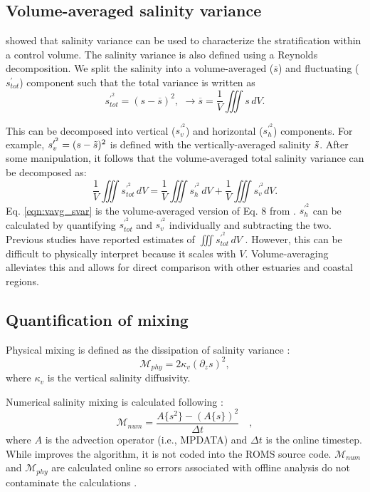 \subsection{Volume-averaged salinity variance}
\citet{Li_2018} showed that salinity variance can be used to characterize the stratification within a control volume. The salinity variance is also defined using a Reynolds decomposition. We split the salinity into a volume-averaged ($\overline{s}$) and fluctuating ($s_{tot}^\prime$) component such that the total variance is written as  
\begin{equation}
        s_{tot}^{\prime^2} = (s-\overline{s})^2, \, \, \xrightarrow{} \overline{s} = \frac{1}{V} \iiint s \, dV.  
\end{equation}

This can be decomposed into vertical ($s_v^{\prime^2}$) and horizontal ($s_h^{\prime^2}$) components. For example, $s_v^{\prime^2} = (s-\Tilde{s})^2$ is defined with the vertically-averaged salinity $\Tilde{s}$. After some manipulation, it follows that the volume-averaged total salinity variance can be decomposed as:
\begin{equation} \label{eqn:vavg_svar}
        \frac{1}{V} \iiint s_{tot}^{\prime^2} \, dV = \frac{1}{V} \iiint s_{h}^{\prime^2} \, dV + \frac{1}{V} \iiint s_{v}^{\prime^2} dV. 
\end{equation}
Eq. \ref{eqn:vavg_svar} is the volume-averaged version of Eq. 8 from \citet{Li_2018}. $s_h^{\prime^2}$ can be calculated by quantifying $s_{tot}^{\prime^2}$ and $s_{v}^{\prime^2}$ individually and subtracting the two. Previous studies have reported estimates of $\iiint s_{tot}^{\prime^2} \, dV$ \citep{Wang_2018, Burchard_2019}. However, this can be difficult to physically interpret because it scales with $V$. Volume-averaging alleviates this and allows for direct comparison with other estuaries and coastal regions.  

\subsection{Quantification of mixing}
Physical mixing is defined as the dissipation of salinity variance \citep{Burchard_2008, MacCready_2018}:
\begin{equation}
        \mathcal{M}_{phy} = 2 \kappa_v \left(\partial_z s \right)^2, 
\end{equation}
where $\kappa_v$ is the vertical salinity diffusivity. 

Numerical salinity mixing is calculated following \cite{Burchard_2008}:
\begin{equation} \label{eq:mnum}
        \mathcal{M}_{num} = \frac{A\{ s^2 \}-\left(A \{s \} \right)^2}{\Delta t} \quad ,
\end{equation}
where $A$ is the advection operator (i.e., MPDATA) and $\Delta t$ is the online timestep. While \citet{Klingbeil_2014} improves the \citet{Burchard_2008} algorithm, it is not coded into the ROMS source code. $\mathcal{M}_{num}$ and $\mathcal{M}_{phy}$ are calculated online so errors associated with offline analysis do not contaminate the calculations \citep{Schlichting23}.

